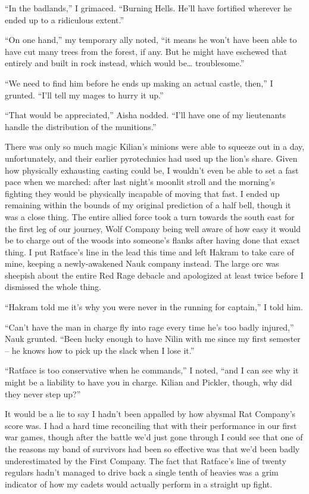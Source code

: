 \documentclass[12pt, openany]{book}
\begin{document}
“In the badlands,” I grimaced. “Burning Hells. He’ll have fortified wherever he ended up to a ridiculous extent.”

“On one hand,” my temporary ally noted, “it means he won’t have been able to have cut many trees from the forest, if any. But he might have eschewed that entirely and built in rock instead, which would be… troublesome.”

“We need to find him before he ends up making an actual castle, then,” I grunted. “I’ll tell my mages to hurry it up.”

“That would be appreciated,” Aisha nodded. “I’ll have one of my lieutenants handle the distribution of the munitions.”

There was only so much magic Kilian’s minions were able to squeeze out in a day, unfortunately, and their earlier pyrotechnics had used up the lion’s share. Given how physically exhausting casting could be, I wouldn’t even be able to set a fast pace when we marched: after last night’s moonlit stroll and the morning’s fighting they would be physically incapable of moving that fast. I ended up remaining within the bounds of my original prediction of a half bell, though it was a close thing. The entire allied force took a turn towards the south east for the first leg of our journey, Wolf Company being well aware of how easy it would be to charge out of the woods into someone’s flanks after having done that exact thing. I put Ratface’s line in the lead this time and left Hakram to take care of mine, keeping a newly-awakened Nauk company instead. The large orc was sheepish about the entire Red Rage debacle and apologized at least twice before I dismissed the whole thing.

“Hakram told me it’s why you were never in the running for captain,” I told him.

“Can’t have the man in charge fly into rage every time he’s too badly injured,” Nauk grunted. “Been lucky enough to have Nilin with me since my first semester – he knows how to pick up the slack when I lose it.”

“Ratface is too conservative when he commands,” I noted, “and I can see why it might be a liability to have you in charge. Kilian and Pickler, though, why did they never step up?”

It would be a lie to say I hadn’t been appalled by how abysmal Rat Company’s score was. I had a hard time reconciling that with their performance in our first war games, though after the battle we’d just gone through I could see that one of the reasons my band of survivors had been so effective was that we’d been badly underestimated by the First Company. The fact that Ratface’s line of twenty regulars hadn’t managed to drive back a single tenth of heavies was a grim indicator of how my cadets would actually perform in a straight up fight.
\end{document}
